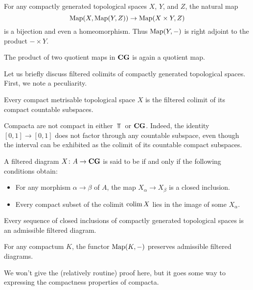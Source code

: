 \begin{cor}
	For any compactly generated topological spaces $ X $, $ Y $, and $ Z $, the natural map
	\[
		\operatorname{Map}( X, \operatorname{Map}(Y, Z) ) \to \operatorname{Map}( X \times Y, Z )
	\]
	is a bijection and even a homeomorphism.
	Thus $ \operatorname{Map}(Y, -) $ is right adjoint to the product $ - \times Y $.
\end{cor}

\begin{cor}
	The product of two quotient maps in $ \textbf{\textup{CG}} $ is again a quotient map.
\end{cor}

Let us briefly discuss filtered colimits of compactly generated topological spaces.
First, we note a peculiarity.

\begin{wrn}
	Every compact metrisable topological space $ X $ is the filtered colimit of its compact countable subspaces.

	Compacta are not compact in either $ \Top $ or $ \textbf{\textup{CG}} $.
	Indeed, the identity $ [0, 1] \to [0, 1] $ does not factor through any countable subspace, even though the interval can be exhibited as the colimit of its countable compact subspaces.
\end{wrn}

\begin{dfn}
	A filtered diagram $ X \colon A \to \textbf{\textup{CG}} $ is said to be  if and only if the following conditions obtain:
	\begin{itemize}
		\item For any morphism $ \alpha \to \beta $ of $ A $, the map $ X_{\alpha} \to X_{\beta} $ is a closed inclusion.
		\item Every compact subset of the colimit $ \operatorname*{colim} X $ lies in the image of some $ X_{\alpha} $.
	\end{itemize}
\end{dfn}

\begin{exm}
	Every sequence of closed inclusions of compactly generated topological spaces is an admissible filtered diagram.
\end{exm}

\begin{lem}
	For any compactum $ K $, the functor $ \operatorname{Map}(K, -) $ preserves admissible filtered diagrams.
\end{lem}

We won't give the (relatively routine) proof here, but it goes some way to expressing the compactness properties of compacta.


